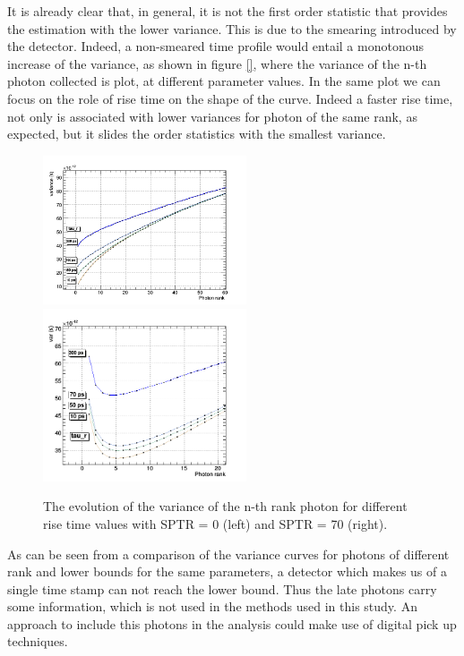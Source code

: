 It is already clear that, in general, it is not the first order statistic that provides the estimation with the lower variance. This is due to the smearing introduced by the detector. Indeed, a non-smeared time profile would entail a monotonous increase of the variance, as shown in figure \ref{}, where the variance of the n-th photon collected is plot, at different parameter values.
In the same plot we can focus on the role of rise time on the shape of the curve. 
Indeed a faster rise time, not only is associated with lower variances for photon of the same rank, as expected, but it slides the order statistics with the smallest variance.
\begin{figure}[htbp]
\begin{center}
\includegraphics[width=6cm]{../Pictures/Chapter_4/taur_rank_nosptr.png}
\includegraphics[width=6cm]{../Pictures/Chapter_4/tau_r_rank.png}
\end{center}
\caption[Rank variance - rise time]{The evolution of the variance of the n-th rank photon for different rise time values with SPTR = 0 (left) and SPTR = 70 (right).}
\label{fig:rise_rank}
\end{figure}
As can be seen from a comparison of the variance curves for photons of different rank and lower bounds for the same parameters, a detector which makes us of a single time stamp can not reach the lower bound. Thus the late photons carry some information, which is not used in the methods used in this study. An approach to include this photons in the analysis could make use of digital pick up techniques. 

